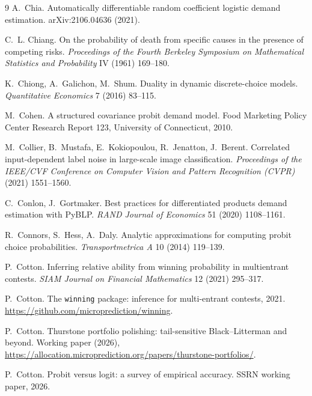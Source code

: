 \documentclass[12pt]{article}
\theoremstyle{remark}
\begin{document}
\begin{thebibliography}{9}
 A.~Chia. Automatically differentiable random coefficient
logistic demand estimation. arXiv:2106.04636 (2021).

 C.~L. Chiang. On the probability of
death from specific causes in the presence of competing risks.
\emph{Proceedings of the Fourth Berkeley Symposium on Mathematical
Statistics and Probability} IV (1961) 169--180.

 K.~Chiong, A.~Galichon, M.~Shum. Duality in dynamic
discrete-choice models. \emph{Quantitative Economics} 7 (2016) 83--115.

 M.~Cohen. A structured covariance
probit demand model. Food Marketing Policy Center Research Report 123,
University of Connecticut, 2010.

 M.~Collier, B.~Mustafa, E.~Kokiopoulou,
R.~Jenatton, J.~Berent. Correlated input-dependent label noise in
large-scale image classification. \emph{Proceedings of the IEEE/CVF Conference on Computer Vision and
Pattern Recognition (CVPR)} (2021)
1551--1560.

 C.~Conlon, J.~Gortmaker. Best practices for
differentiated products demand estimation with PyBLP. \emph{RAND Journal of
Economics} 51 (2020) 1108--1161.

 R.~Connors, S.~Hess, A.~Daly. Analytic approximations
for computing probit choice probabilities. \emph{Transportmetrica A} 10
(2014) 119--139.

 P.~Cotton. Inferring relative ability from winning
probability in multientrant contests. \emph{SIAM Journal on Financial Mathematics}
12 (2021) 295--317.

 P.~Cotton. The \texttt{winning} package: inference for multi-entrant contests,
2021. \url{https://github.com/microprediction/winning}.

 P.~Cotton. Thurstone
portfolio polishing: tail-sensitive Black--Litterman and beyond.
Working paper (2026),
\url{https://allocation.microprediction.org/papers/thurstone-portfolios/}.

 P.~Cotton. Probit versus logit:
a survey of empirical accuracy. SSRN working paper, 2026.


\end{thebibliography}
\end{document}
